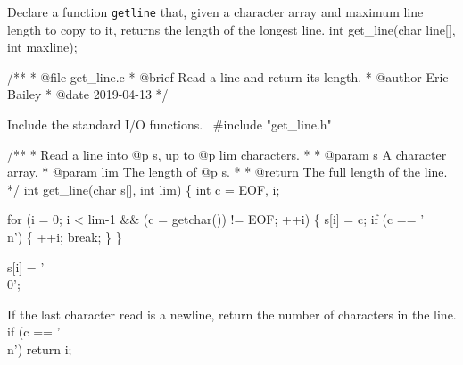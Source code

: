 Declare a function {\tt{}\protect{}get{}line} that, given a character array and maximum line length to copy to it, returns the length of the longest line.
\nwenddocs{}\plusendmoddef
int get_line(char line[], int maxline);


\nwendcode{}\nwdocspar


\nwenddocs{}\endmoddef{}
/**
 * @file get_line.c
 * @brief Read a line and return its length.
 * @author Eric Bailey
 * @date 2019-04-13
 */


\LA{}Include the standard I/O functions.~{\nwtagstyle{}}\RA{}
#include "get_line.h"


/**
 * Read a line into @p s, up to @p lim characters.
 *
 * @param s A character array.
 * @param lim The length of @p s.
 *
 * @return The full length of the line.
 */
int get_line(char s[], int lim)
\{
    int c = EOF, i;

    for (i = 0; i < lim-1 && (c = getchar()) != EOF; ++i) \{
        s[i] = c;
        if (c == '\\n') \{
            ++i;
            break;
        \}
    \}

    s[i] = '\\0';

\eatline
{}\nwendcode{}\nwdocspar
If the last character read is a newline, return the number of characters in the line.
\nwenddocs{}\plusendmoddef
    if (c == '\\n')
        return i;

